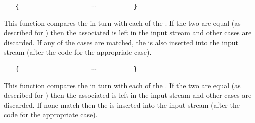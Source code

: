 \documentclass[oneside]{book}
\begin{document}
\begin{function}{\TlVarCaseT}
\begin{syntax}
 
~ ~ \verb"{"
~ ~ ~ ~  
~ ~ ~ ~  
~ ~ ~ ~ $\cdots$
~ ~ ~ ~  
~ ~ \verb"}"
~ ~ 
\end{syntax}
This function compares the  in turn
with each of the . If the two
are equal (as described for )
then the associated  is left in the input
stream and other cases are discarded. If any of the
cases are matched, the  is also inserted into the
input stream (after the code for the appropriate case).
\begin{demohigh}
\IgnoreSpacesOn
\TlSet {}
\TlSet {}
\TlSet {}
\TlSet {}
\TlVarCaseT {}
\IgnoreSpacesOff
\end{demohigh}
\end{function}

\begin{function}{\TlVarCaseF}
\begin{syntax}
 
~ ~ \verb"{"
~ ~ ~ ~  
~ ~ ~ ~  
~ ~ ~ ~ $\cdots$
~ ~ ~ ~  
~ ~ \verb"}"
~ ~ 
\end{syntax}
This function compares the  in turn
with each of the . If the two
are equal (as described for )
then the associated  is left in the input
stream and other cases are discarded. If none match then the 
is inserted into the input stream (after the code for the appropriate case).
\begin{demohigh}
\IgnoreSpacesOn
\TlSet {}
\TlSet {}
\TlSet {}
\TlSet {}
\TlVarCaseF {}
\IgnoreSpacesOff
\end{demohigh}
\end{function}
\end{document}
